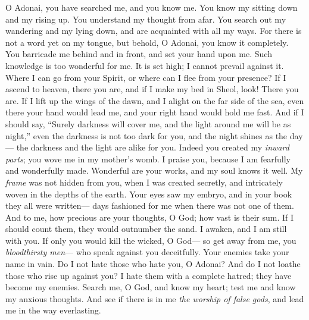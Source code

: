 \begin{biblechapter} %
 O Adonai, you have searched me, and you know me.
\verse You know my sitting down and my rising up. 
You understand my thought from afar.
\verse You search out my wandering and my lying down, 
and are acquainted with all my ways.
\verse For there is not a word yet on my tongue, 
but behold, O Adonai, you know it completely.
\verse You barricade me behind and in front, 
and set your hand upon me.
\verse Such knowledge is too wonderful for me. 
It is set high; I cannot prevail against it.
\verse Where I can go from your Spirit, 
or where can I flee from your presence?
\verse If I ascend to heaven, there you are, 
and if I make my bed in Sheol, look! There you are.
\verse If I lift up the wings of the dawn, 
and I alight on the far side of the sea,
\verse even there your hand would lead me, 
and your right hand would hold me fast.
\verse And if I should say, “Surely darkness will cover me, 
and the light around me will be as night,”
\verse even the darkness is not too dark for you, 
and the night shines as the day— 
the darkness and the light are alike for you.
\verse Indeed you created my \textit{inward parts}; 
you wove me in my mother’s womb.
\verse I praise you, because I am fearfully 
and wonderfully made. 
Wonderful are your works, 
and my soul knows it well.
\verse My \textit{frame} was not hidden from you, 
when I was created secretly, 
and intricately woven 
in the depths of the earth.
\verse Your eyes saw my embryo, 
and in your book they all were written— 
days fashioned for me when there was not one of them.
\verse And to me, how precious are your thoughts, O God; 
how vast is their sum.
\verse If I should count them, 
they would outnumber the sand. 
I awaken, and I am still with you.
\verse If only you would kill the wicked, O God— 
so get away from me, you \textit{bloodthirsty men}—
\verse who speak against you deceitfully. 
Your enemies take your name in vain.
\verse Do I not hate those who hate you, O Adonai? 
And do I not loathe those who rise up against you?
\verse I hate them with a complete hatred; 
they have become my enemies.
\verse Search me, O God, and know my heart; 
test me and know my anxious thoughts.
\verse And see if there is in me \textit{the worship of false gods}, 
and lead me in the way everlasting.
\end{biblechapter}

